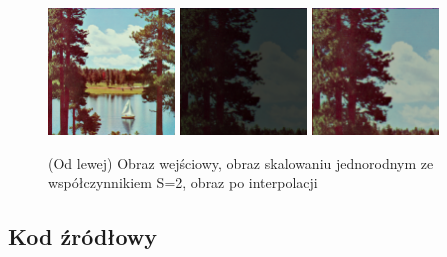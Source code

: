 \documentclass[final,a4paper,openany,12pt]{mwbk}
\begin{document}
\begin{figure}[H]
	\begin{center}
		\includegraphics[width=0.3\textwidth]{2/2Geo_ScaleJ_Original}
		\includegraphics[width=0.3\textwidth]{2/2Geo_ScaleJ_Result}
		\includegraphics[width=0.3\textwidth]{2/2Geo_ScaleJ_Result_Interp}
	\end{center}
	\caption{(Od lewej) Obraz wejściowy, obraz skalowaniu jednorodnym ze współczynnikiem S=2, obraz po interpolacji }
\end{figure}

\subsection*{Kod źródłowy}
\end{document}

